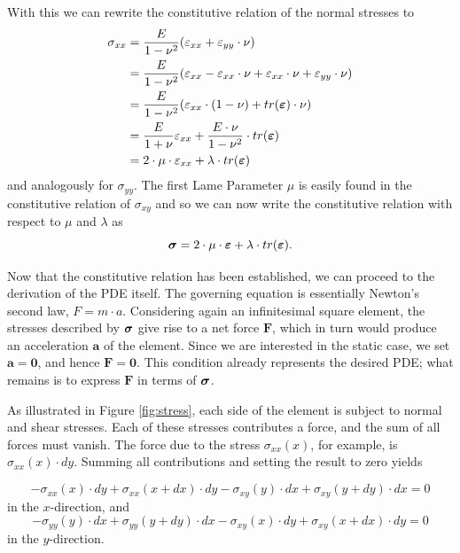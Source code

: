 With this we can rewrite the constitutive relation of the normal stresses to 
\begin{align*}
    \sigma_{xx}&=\frac{E}{1-\nu^2}(\varepsilon_{xx}+\varepsilon_{yy}\cdot \nu)\\
    &=\frac{E}{1-\nu^2}(\varepsilon_{xx}-\varepsilon_{xx}\cdot\nu+\varepsilon_{xx}\cdot \nu+\varepsilon_{yy}\cdot \nu)\\
    &=\frac{E}{1-\nu^2}(\varepsilon_{xx}\cdot(1-\nu)+tr(\boldsymbol{\varepsilon})\cdot \nu)\\
    &=\frac{E}{1+\nu}\varepsilon_{xx}+\frac{E\cdot \nu}{1-\nu^2}\cdot tr(\boldsymbol{\varepsilon})\\
    &=2\cdot \mu\cdot \varepsilon_{xx}+\lambda \cdot tr(\boldsymbol{\varepsilon})\\
\end{align*}
and analogously for $\sigma_{yy}$. The first Lame Parameter $\mu$ is easily found in the constitutive relation of $\sigma_{xy}$ and so we can now write the constitutive relation with respect to $\mu$ and $\lambda$ as
\begin{equation*}
    \boldsymbol{\sigma} = 2\cdot \mu\cdot \boldsymbol{\varepsilon} + \lambda\cdot tr(\boldsymbol{\varepsilon}).
\end{equation*}






Now that the constitutive relation has been established, we can proceed to the derivation of the PDE itself. The governing equation is essentially Newton’s second law, $F = m \cdot a$. Considering again an infinitesimal square element, the stresses described by $\boldsymbol{\sigma}$ give rise to a net force $\mathbf{F}$, which in turn would produce an acceleration $\mathbf{a}$ of the element. Since we are interested in the static case, we set $\mathbf{a} = \mathbf{0}$, and hence $\mathbf{F} = \mathbf{0}$. This condition already represents the desired PDE; what remains is to express $\mathbf{F}$ in terms of $\boldsymbol{\sigma}$.  

As illustrated in Figure \ref{fig:stress}, each side of the element is subject to normal and shear stresses. Each of these stresses contributes a force, and the sum of all forces must vanish. The force due to the stress $\sigma_{xx}(x)$, for example, is $\sigma_{xx}(x)\cdot dy$. Summing all contributions and setting the result to zero yields  

\begin{equation*}
    -\sigma_{xx}(x)\cdot dy + 
    \sigma_{xx}(x+dx)\cdot dy 
    - \sigma_{xy}(y)\cdot dx+ 
    \sigma_{xy}(y+dy)\cdot dx= 0
\end{equation*}
in the $x$-direction, and
\begin{equation*}
    -\sigma_{yy}(y)\cdot dx+
    \sigma_{yy}(y+dy)\cdot dx-
    \sigma_{xy}(x)\cdot dy+ 
    \sigma_{xy}(x+dx)\cdot dy= 0
\end{equation*}
in the $y$-direction.  

